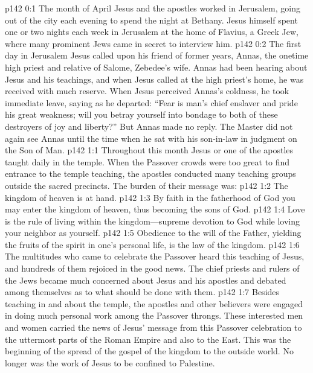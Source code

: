 \author{Midwayer Commission}
\vs p142 0:1 The month of April Jesus and the apostles worked in Jerusalem, going out of the city each evening to spend the night at Bethany. Jesus himself spent one or two nights each week in Jerusalem at the home of Flavius, a Greek Jew, where many prominent Jews came in secret to interview him.
\pc \vs p142 0:2 The first day in Jerusalem Jesus called upon his friend of former years, Annas, the onetime high priest and relative of Salome, Zebedee’s wife. Annas had been hearing about Jesus and his teachings, and when Jesus called at the high priest’s home, he was received with much reserve. When Jesus perceived Annas’s coldness, he took immediate leave, saying as he departed: \textcolor{ubdarkred}{“Fear is man’s chief enslaver and pride his great weakness; will you betray yourself into bondage to both of these destroyers of joy and liberty?”} But Annas made no reply. The Master did not again see Annas until the time when he sat with his son\hyp{}in\hyp{}law in judgment on the Son of Man.\plusone
{}
\vs p142 1:1 Throughout this month Jesus or one of the apostles taught daily in the temple. When the Passover crowds were too great to find entrance to the temple teaching, the apostles conducted many teaching groups outside the sacred precincts. The burden of their message was:
\pc \vs p142 1:2 \bibnobreakspace The kingdom of heaven is at hand.
\vs p142 1:3 \bibnobreakspace By faith in the fatherhood of God you may enter the kingdom of heaven, thus becoming the sons of God.
\vs p142 1:4 \bibnobreakspace Love is the rule of living within the kingdom---supreme devotion to God while loving your neighbor as yourself.
\vs p142 1:5 \bibnobreakspace Obedience to the will of the Father, yielding the fruits of the spirit in one’s personal life, is the law of the kingdom.
\pc \vs p142 1:6 The multitudes who came to celebrate the Passover heard this teaching of Jesus, and hundreds of them rejoiced in the good news. The chief priests and rulers of the Jews became much concerned about Jesus and his apostles and debated among themselves as to what should be done with them.
\vs p142 1:7 Besides teaching in and about the temple, the apostles and other believers were engaged in doing much personal work among the Passover throngs. These interested men and women carried the news of Jesus’ message from this Passover celebration to the uttermost parts of the Roman Empire and also to the East. This was the beginning of the spread of the gospel of the kingdom to the outside world. No longer was the work of Jesus to be confined to Palestine.

